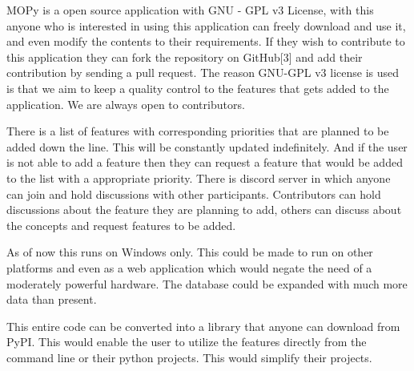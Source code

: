 \hspace{4em}MOPy is a open source application with GNU - GPL v3 License, with this anyone who is interested in using this application can freely download and use it, and even modify the contents to their requirements. If they wish to contribute to this application they can fork the repository on GitHub[3] and add their contribution by sending a pull request. The reason GNU-GPL v3 license is used is that we aim to keep a quality control to the features that gets added to the application. We are always open to contributors.

There is a list of features with corresponding priorities that are planned to be added down the line. This will be constantly updated indefinitely. And if the user is not able to add a feature then they can request a feature that would be added to the list with a appropriate priority. There is discord server in which anyone can join and hold discussions with other participants. Contributors can hold discussions about the feature they are planning to add, others can discuss about the concepts and request features to be added. 

As of now this runs on Windows only. This could be made to run on other platforms and even as a web application which would negate the need of a moderately powerful hardware. The database could be expanded with much more data than present.

This entire code can be converted into a library that anyone can download from PyPI. This would enable the user to utilize the features directly from the command line or their python projects. This would simplify their projects.